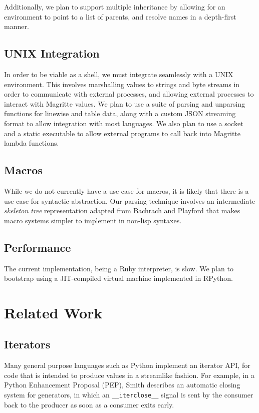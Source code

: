 \documentclass[english,PRO]{ipsj}
\begin{document}
Additionally, we plan to support multiple inheritance by allowing for an environment to point to a list of parents, and resolve names in a depth-first manner.

\subsection{UNIX Integration}\noindent
In order to be viable as a shell, we must integrate seamlessly with a UNIX environment. This involves marshalling values to strings and byte streams in order to communicate with external processes, and allowing external processes to interact with Magritte values. We plan to use a suite of parsing and unparsing functions for linewise and table data, along with a custom JSON streaming format to allow integration with most languages. We also plan to use a socket and a static executable to allow external programs to call back into Magritte lambda functions.

\subsection{Macros}\noindent
While we do not currently have a use case for macros, it is likely that there is a use case for syntactic abstraction. Our parsing technique involves an intermediate \emph{skeleton tree} representation adapted from Bachrach and Playford\cite{skeleton-trees} that makes macro systems simpler to implement in non-lisp syntaxes.

\subsection{Performance}\noindent
The current implementation, being a Ruby interpreter, is slow. We plan to bootstrap using a JIT-compiled virtual machine implemented in RPython.

\section{Related Work}\label{related-work}

\subsection{Iterators}
\noindent
Many general purpose languages such as Python implement an iterator API, for code that is intended to produce values in a streamlike fashion. For example, in a Python Enhancement Proposal (PEP), Smith\cite{pep533} describes an automatic closing system for generators, in which an \verb/__iterclose__/ signal is sent by the consumer back to the producer as soon as a consumer exits early.
\end{document}
